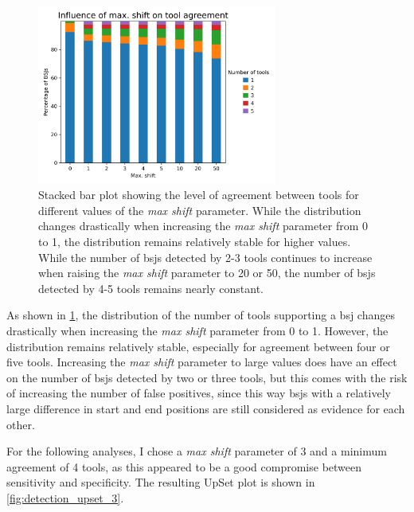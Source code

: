 \begin{figure}[H]
    \centering

    \includegraphics[width=0.7\textwidth]{chapters/4_results_and_discussion/figures/detection/shift_agreement.png}
    \caption{Stacked bar plot showing the level of agreement between tools for
        different values of the \textit{max shift} parameter.
        While the distribution changes drastically when increasing the \textit{max
            shift} parameter from 0 to 1, the distribution remains relatively stable for
        higher values.
        While the number of \gls{bsj}s detected by 2-3 tools continues to increase when
        raising the \textit{max shift} parameter to 20 or 50, the number of \gls{bsj}s
        detected by 4-5 tools remains nearly constant.
    }
    \label{fig:shift_agreement}
\end{figure}

As shown in \cref{fig:shift_agreement}, the distribution of the number of tools
supporting a \gls{bsj} changes drastically when increasing the \textit{max
    shift} parameter from 0 to 1.
However, the distribution remains relatively stable, especially for agreement
between four or five tools.
Increasing the \textit{max shift} parameter to large values does have an effect
on the number of \gls{bsj}s detected by two or three tools, but this comes with
the risk of increasing the number of false positives, since this way \gls{bsj}s
with a relatively large difference in start and end positions are still
considered as evidence for each other.

For the following analyses, I chose a \textit{max shift} parameter of 3 and a
minimum agreement of 4 tools, as this appeared to be a good compromise between
sensitivity and specificity.
The resulting UpSet plot is shown in \cref{fig:detection_upset_3}.

